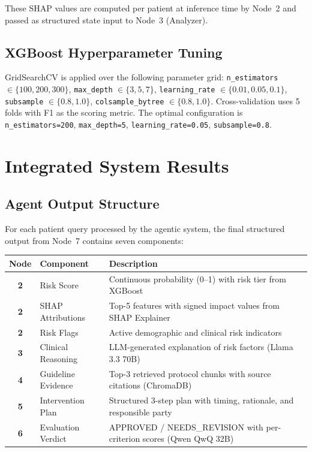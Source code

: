 \documentclass[12pt, a4paper]{report}
\begin{document}
These SHAP values are computed per patient at inference time by Node~2 and passed as structured state input to Node~3 (Analyzer).

\section{XGBoost Hyperparameter Tuning}

GridSearchCV is applied over the following parameter grid: \texttt{n\_estimators} $\in \{100, 200, 300\}$, \texttt{max\_depth} $\in \{3, 5, 7\}$, \texttt{learning\_rate} $\in \{0.01, 0.05, 0.1\}$, \texttt{subsample} $\in \{0.8, 1.0\}$, \texttt{colsample\_bytree} $\in \{0.8, 1.0\}$. Cross-validation uses 5 folds with F1 as the scoring metric. The optimal configuration is \texttt{n\_estimators=200}, \texttt{max\_depth=5}, \texttt{learning\_rate=0.05}, \texttt{subsample=0.8}.

\chapter{Integrated System Results}

\section{Agent Output Structure}

For each patient query processed by the agentic system, the final structured output from Node~7 contains seven components:

\vspace{0.3cm}
\renewcommand{\arraystretch}{1.7}
\begin{tabularx}{\textwidth}{>{\bfseries\color{primaryblue}}c l X}
  \toprule
  \rowcolor{boxbg}
  \textbf{Node} & \textbf{Component} & \textbf{Description} \\
  \midrule
  2 & Risk Score            & Continuous probability (0--1) with risk tier from XGBoost \\
  2 & SHAP Attributions     & Top-5 features with signed impact values from SHAP Explainer \\
  2 & Risk Flags            & Active demographic and clinical risk indicators \\
  3 & Clinical Reasoning    & LLM-generated explanation of risk factors (Llama 3.3 70B) \\
  \rowcolor{boxbg}
  4 & Guideline Evidence    & Top-3 retrieved protocol chunks with source citations (ChromaDB) \\
  5 & Intervention Plan     & Structured 3-step plan with timing, rationale, and responsible party \\
  6 & Evaluation Verdict    & APPROVED / NEEDS\_REVISION with per-criterion scores (Qwen QwQ 32B) \\
  \bottomrule
\end{tabularx}
\end{document}
